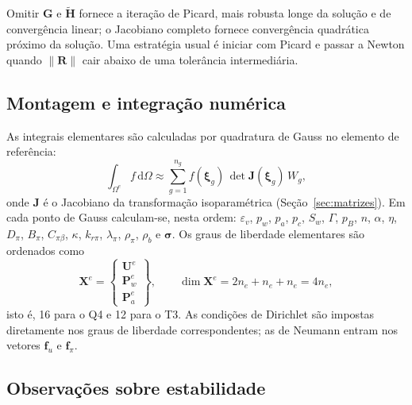 \documentclass[11pt,a4paper]{article}
\newcommand{\dd}{\mathrm{d}}
\begin{document}
Omitir $\mathbf G$ e $\tilde{\mathbf H}$ fornece a iteração de Picard, mais
robusta longe da solução e de convergência linear; o Jacobiano completo
fornece convergência quadrática próximo da solução. Uma estratégia usual
é iniciar com Picard e passar a Newton quando $\|\mathbf R\|$ cair abaixo
de uma tolerância intermediária.

\subsection{Montagem e integração numérica}

As integrais elementares são calculadas por quadratura de Gauss no elemento
de referência:
\begin{equation*}
\int_{\Omega^e}f\,\dd\Omega\approx\sum_{g=1}^{n_g}f(\boldsymbol\xi_g)\,\det\mathbf J(\boldsymbol\xi_g)\,W_g ,
\end{equation*}
onde $\mathbf J$ é o Jacobiano da transformação isoparamétrica
(Seção~\ref{sec:matrizes}). Em cada ponto de Gauss calculam-se, nesta ordem:
$\varepsilon_v$, $p_w$, $p_a$, $p_c$, $S_w$, $\Gamma$, $p_B$, $n$, $\alpha$,
$\eta$, $D_\pi$, $B_\pi$, $C_{\pi\beta}$, $\kappa$, $k_{r\pi}$, $\lambda_\pi$,
$\rho_\pi$, $\rho_b$ e $\boldsymbol\sigma$. Os graus de liberdade elementares
são ordenados como
\begin{equation*}
\mathbf X^e=\begin{Bmatrix}\mathbf U^e\\ \mathbf P_w^e\\ \mathbf P_a^e\end{Bmatrix},
\qquad
\dim\mathbf X^e=2n_e+n_e+n_e=4n_e,
\end{equation*}
isto é, 16 para o Q4 e 12 para o T3. As condições de Dirichlet são impostas
diretamente nos graus de liberdade correspondentes; as de Neumann entram
nos vetores $\mathbf f_u$ e $\mathbf f_\pi$.

\subsection{Observações sobre estabilidade}
\end{document}

